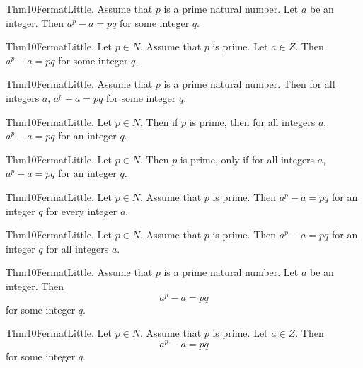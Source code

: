 \documentclass{article}
\begin{document}
Thm10FermatLittle. Assume that $p$ is a prime natural number. Let $a$ be an integer. Then $a ^ {p}- a = p q$ for some integer $q$.

Thm10FermatLittle. Let $p \in N$. Assume that $p$ is prime. Let $a \in Z$. Then $a ^ {p}- a = p q$ for some integer $q$.

Thm10FermatLittle. Assume that $p$ is a prime natural number. Then for all integers $a$, $a ^ {p}- a = p q$ for some integer $q$.

Thm10FermatLittle. Let $p \in N$. Then if $p$ is prime, then for all integers $a$, $a ^ {p}- a = p q$ for an integer $q$.

Thm10FermatLittle. Let $p \in N$. Then $p$ is prime, only if for all integers $a$, $a ^ {p}- a = p q$ for an integer $q$.

Thm10FermatLittle. Let $p \in N$. Assume that $p$ is prime. Then $a ^ {p}- a = p q$ for an integer $q$ for every integer $a$.

Thm10FermatLittle. Let $p \in N$. Assume that $p$ is prime. Then $a ^ {p}- a = p q$ for an integer $q$ for all integers $a$.

Thm10FermatLittle. Assume that $p$ is a prime natural number. Let $a$ be an integer. Then $$a ^ {p}- a = p q$$ for some integer $q$.

Thm10FermatLittle. Let $p \in N$. Assume that $p$ is prime. Let $a \in Z$. Then $$a ^ {p}- a = p q$$ for some integer $q$.
\end{document}
